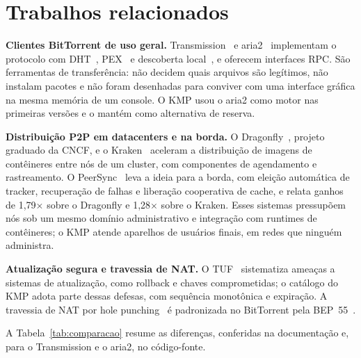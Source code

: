 \documentclass[12pt]{article}
\newcommand{\kmp}{\textsc{KMP}}
\begin{document}
\section{Trabalhos relacionados}
\label{sec:relacionados}

\textbf{Clientes BitTorrent de uso geral.} Transmission~\cite{transmission} e
aria2~\cite{aria2} implementam o protocolo com DHT~\cite{bep5},
PEX~\cite{bep11} e descoberta local~\cite{bep14}, e oferecem interfaces RPC.
São ferramentas de transferência: não decidem quais arquivos são legítimos,
não instalam pacotes e não foram desenhadas para conviver com uma interface
gráfica na mesma memória de um console. O \kmp{} usou o aria2 como motor nas
primeiras versões e o mantém como alternativa de reserva.

\textbf{Distribuição P2P em datacenters e na borda.} O
Dragonfly~\cite{dragonfly}, projeto graduado da CNCF, e o
Kraken~\cite{kraken} aceleram a distribuição de imagens de contêineres entre
nós de um cluster, com componentes de agendamento e rastreamento. O
PeerSync~\cite{deng2026peersync} leva a ideia para a borda, com eleição
automática de tracker, recuperação de falhas e liberação cooperativa de
cache, e relata ganhos de 1,79$\times$ sobre o Dragonfly e 1,28$\times$ sobre
o Kraken. Esses sistemas pressupõem nós sob um mesmo domínio administrativo e
integração com runtimes de contêineres; o \kmp{} atende aparelhos de usuários
finais, em redes que ninguém administra.

\textbf{Atualização segura e travessia de NAT.} O TUF~\cite{samuel2010tuf}
sistematiza ameaças a sistemas de atualização, como rollback e chaves
comprometidas; o catálogo do \kmp{} adota parte dessas defesas, com sequência
monotônica e expiração. A travessia de NAT por hole
punching~\cite{ford2005nat,rfc5128} é padronizada no BitTorrent pela
BEP~55~\cite{bep55}.

A Tabela~\ref{tab:comparacao} resume as diferenças, conferidas na
documentação e, para o Transmission e o aria2, no código-fonte.
\end{document}
